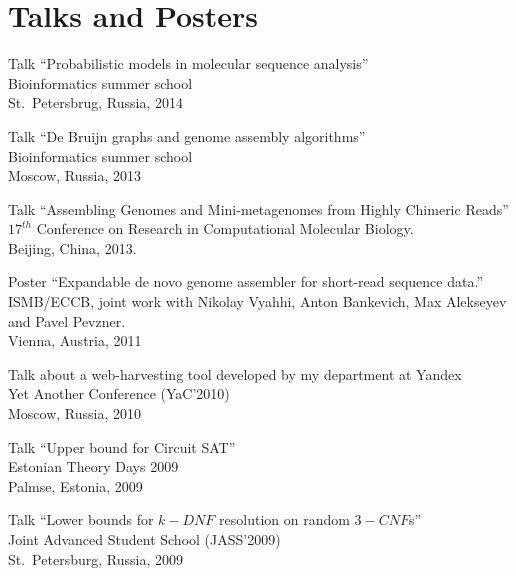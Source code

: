 \section{Talks and Posters}
\begin{innerlist}
 \item Talk ``Probabilistic models in molecular sequence analysis''\\
       Bioinformatics summer school\\
       St.~Petersbrug, Russia, 2014
 \item Talk ``De Bruijn graphs and genome assembly algorithms''\\
       Bioinformatics summer school\\
       Moscow, Russia, 2013
 \item Talk ``Assembling Genomes and Mini-metagenomes from Highly Chimeric Reads''
       $17^{th}$ Conference on Research in Computational Molecular Biology.\\ 
       Beijing, China, 2013.
 \item Poster ``Expandable de novo genome assembler for short-read sequence data.''\\
       ISMB/ECCB, joint work with Nikolay Vyahhi, Anton Bankevich, Max Alekseyev and Pavel Pevzner.\\ 
       Vienna, Austria, 2011
 \item Talk about a web-harvesting tool developed by my department at Yandex\\
       Yet Another Conference (YaC'2010)\\
       Moscow, Russia, 2010
 \item Talk ``Upper bound for Circuit SAT''\\
       Estonian Theory Days 2009\\
       Palmse, Estonia, 2009
 \item Talk ``Lower bounds for $k-DNF$ resolution on random $3-CNF$s''\\
       Joint Advanced Student School (JASS'2009)\\
       St.~Petersburg, Russia, 2009
\end{innerlist}
